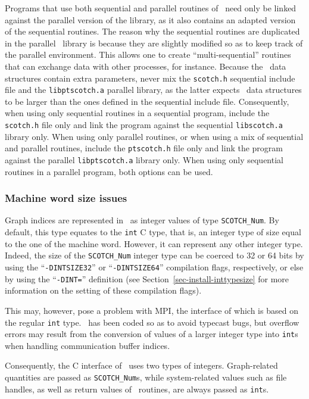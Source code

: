 Programs that use both sequential and parallel routines of
\scotch\ need only be linked against the parallel version of the
library, as it also contains an adapted version of the sequential
routines. The reason why the sequential routines are duplicated in the
parallel \ptscotch\ library is because they are slightly modified so
as to keep track of the parallel environment. This allows one to
create ``multi-sequential'' routines that can exchange data with other
processes, for instance. Because the \libscotch\ data structures
contain extra parameters, never mix the \texttt{scotch.h} sequential
include file and the \texttt{libptscotch.a} parallel library, as the
latter expects \scotch\ data structures to be larger than the ones
defined in the sequential include file. Consequently, when using only
sequential routines in a sequential program, include the
\texttt{scotch.h} file only and link the program against the sequential
\texttt{libscotch.a} library only. When using only parallel routines,
or when using a mix of sequential and parallel routines, include the
\texttt{ptscotch.h} file only and link the program against the parallel
\texttt{libptscotch.a} library only. When using only sequential
routines in a parallel program, both options can be used.

\subsubsection{Machine word size issues}
\label{sec-lib-inttypesize}

Graph indices are represented in \scotch\ as integer values of type
{\tt SCOTCH\_\lbt Num}. By default, this type equates to the {\tt int}
C type, that is, an integer type of size equal to the one of
the machine word. However, it can represent any other integer
type. Indeed, the size of the {\tt SCOTCH\_\lbt Num} integer type can
be coerced to 32 or 64 bits by using the ``{\tt -DINTSIZE32}'' or
``{\tt -DINTSIZE64}'' compilation flags, respectively, or else by
using the ``{\tt -DINT=}'' definition (see
Section~\ref{sec-install-inttypesize} for more information on the
setting of these compilation flags).

This may, however, pose a problem with MPI, the interface of which is
based on the regular {\tt int} type. \ptscotch\ has been coded so
as to avoid typecast bugs, but overflow errors may result from the
conversion of values of a larger integer type into {\tt int}s when
handling communication buffer indices.

Consequently, the C interface of \scotch\ uses two types of integers.
Graph-related quantities are passed as {\tt SCOTCH\_\lbt Num}s,
while system-related values such as file handles, as well as
return values of \libscotch\ routines, are always passed as
{\tt int}s.

